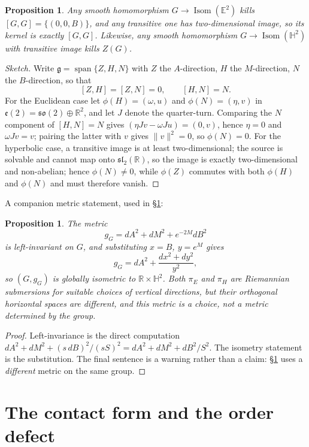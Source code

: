 \documentclass[11pt]{article}
\newtheorem{proposition}[theorem]{Proposition}
\begin{document}
\begin{proposition}
\label{prop:obstruction}
Any smooth homomorphism $G\to\operatorname{Isom}(\mathbb E^2)$ kills
$[G,G]=\{(0,0,B)\}$, and any transitive one has two-dimensional image, so its
kernel is exactly $[G,G]$. Likewise, any smooth homomorphism
$G\to\operatorname{Isom}(\mathbb H^2)$ with transitive image kills $Z(G)$.
\end{proposition}

\begin{proof}[Sketch]
Write $\mathfrak g=\operatorname{span}\{Z,H,N\}$ with $Z$ the $A$-direction, $H$
the $M$-direction, $N$ the $B$-direction, so that
\[
[Z,H]=[Z,N]=0,\qquad [H,N]=N .
\]
For the Euclidean case let $\phi(H)=(\omega,u)$ and $\phi(N)=(\eta,v)$ in
$\mathfrak e(2)=\mathfrak{so}(2)\oplus\mathbb R^2$, and let $J$ denote the
quarter-turn. Comparing the $N$ component of $[H,N]=N$ gives
$(\eta Jv-\omega Ju)=(0,v)$, hence $\eta=0$ and $\omega Jv=v$; pairing the latter
with $v$ gives $\|v\|^2=0$, so $\phi(N)=0$. For the hyperbolic case, a transitive
image is at least two-dimensional; the source is solvable and cannot map onto
$\mathfrak{sl}_2(\mathbb R)$, so the image is exactly two-dimensional and
non-abelian; hence $\phi(N)\ne0$, while $\phi(Z)$ commutes with both $\phi(H)$
and $\phi(N)$ and must therefore vanish.
\end{proof}

A companion metric statement, used in \S\ref{sec:contact}:

\begin{proposition}
\label{prop:left-invariant-metric}
The metric
\[
g_G=dA^2+dM^2+e^{-2M}dB^2
\]
is left-invariant on $G$, and substituting $x=B$, $y=e^M$ gives
\[
g_G=dA^2+\frac{dx^2+dy^2}{y^2},
\]
so $(G,g_G)$ is globally isometric to $\mathbb R\times\mathbb H^2$. Both
$\pi_E$ and $\pi_H$ are Riemannian submersions for suitable choices of vertical
directions, but their orthogonal horizontal spaces are different, and this metric
is a choice, not a metric determined by the group.
\end{proposition}

\begin{proof}
Left-invariance is the direct computation
$dA^2+dM^2+(s\,dB)^2/(sS)^2=dA^2+dM^2+dB^2/S^2$. The isometry statement is the
substitution. The final sentence is a warning rather than a claim: \S\ref{sec:contact}
uses a \emph{different} metric on the same group.
\end{proof}

\section{The contact form and the order defect}
\label{sec:contact}
\end{document}
